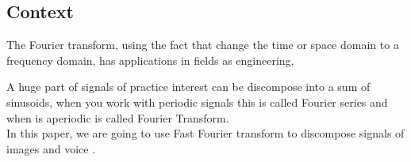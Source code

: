 \subsection{Context}


The Fourier transform, using the fact that change the time or space domain to a frequency domain, has applications in fields as engineering, 


\noindent
A huge part of signals of practice interest can be discompose into a sum of sinusoids, when you work with periodic signals this is called Fourier series and when is aperiodic is called Fourier Transform. \\


\noindent
In this paper, we are going to use Fast Fourier transform to discompose signals of images and voice .
